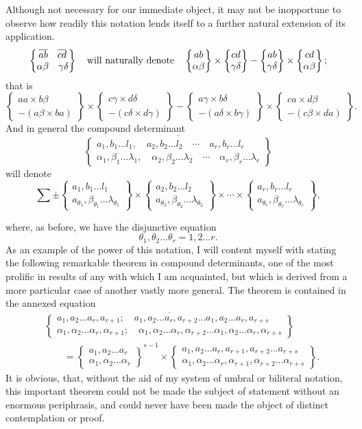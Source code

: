 \documentclass[11pt]{article}
\newcommand{\sourcepage}[1]{\marginpar{\scriptsize p.~#1}}
\newcommand{\bd}[2]{\left\{\begin{matrix}#1\\#2\end{matrix}\right\}}
\begin{document}
{{Although not necessary for our immediate object, it may not be inopportune to observe how readily this notation lends itself to a further natural extension of its application.
\[
\bd{\overline{ab}\quad \overline{cd}}{\alpha\beta\quad\gamma\delta}
\quad\hbox{will naturally denote}\quad
\bd{ab}{\alpha\beta}\times\bd{cd}{\gamma\delta}-\bd{ab}{\gamma\delta}\times\bd{cd}{\alpha\beta};
\]
that is
\[
\left\{\begin{matrix}aa\times b\beta\\-(a\beta\times ba)\end{matrix}\right\}
\times
\left\{\begin{matrix}c\gamma\times d\delta\\-(c\delta\times d\gamma)\end{matrix}\right\}
-
\left\{\begin{matrix}a\gamma\times b\delta\\-(a\delta\times b\gamma)\end{matrix}\right\}
\times
\left\{\begin{matrix}ca\times d\beta\\-(c\beta\times da)\end{matrix}\right\}.
\]
And in general the compound determinant
\[
\overline{\bd{a_1,b_1\ldots l_1,\quad a_2,b_2\ldots l_2\quad\cdots\quad a_r,b_r\ldots l_r}{\alpha_1,\beta_1\ldots\lambda_1,\quad \alpha_2,\beta_2\ldots\lambda_2\quad\cdots\quad \alpha_r,\beta_r\ldots\lambda_r}}
\]
will denote
\[
\sum \pm
 \bd{a_1,b_1\ldots l_1}{a_{\theta_1},\beta_{\theta_1}\ldots\lambda_{\theta_1}}
 \times
 \bd{a_2,b_2\ldots l_2}{a_{\theta_2},\beta_{\theta_2}\ldots\lambda_{\theta_2}}
 \times\cdots\times
 \bd{a_r,b_r\ldots l_r}{a_{\theta_r},\beta_{\theta_r}\ldots\lambda_{\theta_r}},
\]

\sourcepage{243}
where, as before, we have the disjunctive equation
\[
\theta_1,\theta_2\ldots\theta_r=1,2\ldots r.
\]
As an example of the power of this notation, I will content myself with stating the following remarkable theorem in compound determinants, one of the most prolific in results of any with which I am acquainted, but which is derived from a more particular case of another vastly more general. The theorem is contained in the annexed equation
\[
\begin{aligned}
&\overline{\bd{a_1,a_2\ldots a_r,a_{r+1};\quad a_1,a_2\ldots a_r,a_{r+2}\ldots a_1,a_2\ldots a_r,a_{r+s}}{
\alpha_1,\alpha_2\ldots\alpha_r,\alpha_{r+1};\quad \alpha_1,\alpha_2\ldots\alpha_r,\alpha_{r+2}\ldots \alpha_1,\alpha_2\ldots\alpha_r,\alpha_{r+s}}} \\
&\qquad =
\bd{a_1,a_2\ldots a_r}{\alpha_1,\alpha_2\ldots\alpha_r}^{s-1}
\times
\bd{a_1,a_2\ldots a_r,a_{r+1},a_{r+2}\ldots a_{r+s}}{\alpha_1,\alpha_2\ldots\alpha_r,\alpha_{r+1},\alpha_{r+2}\ldots\alpha_{r+s}}.
\end{aligned}\tag{1}
\]
It is obvious, that, without the aid of my system of umbral or biliteral notation, this important theorem could not be made the subject of statement without an enormous periphrasis, and could never have been made the object of distinct contemplation or proof.

}}
\end{document}
